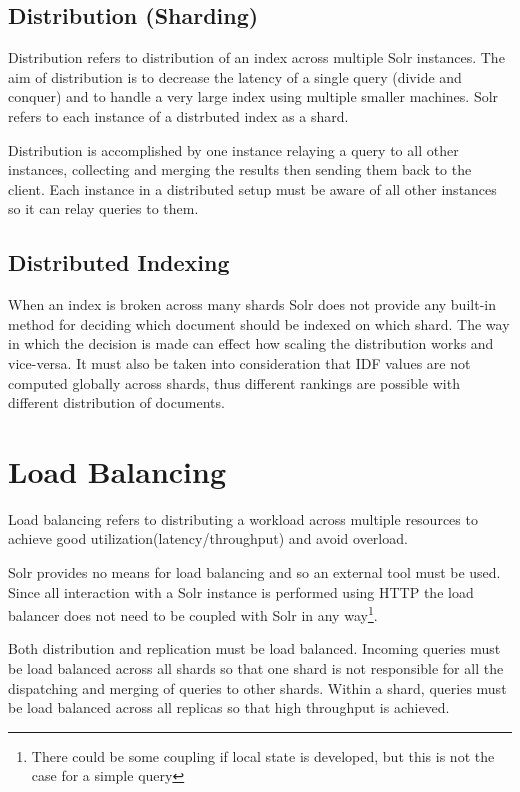 \documentclass{article}
\begin{document}
\subsection{Distribution (Sharding)}
Distribution refers to distribution of an index across multiple Solr
instances. The aim of distribution is to decrease the latency of a
single query (divide and conquer) and to handle a very large index
using multiple smaller machines. Solr refers to each instance of a
distrbuted index as a shard.

Distribution is accomplished by one instance relaying a query to all
other instances, collecting and merging the results then sending them
back to the client. Each instance in a distributed setup must be aware
of all other instances so it can relay queries to them.

\subsection{Distributed Indexing}
When an index is broken across many shards Solr does not provide any
built-in method for deciding which document should be indexed on which
shard. The way in which the decision is made can effect how scaling
the distribution works and vice-versa. It must also be taken into
consideration that IDF values are not computed globally across shards,
thus different rankings are possible with different distribution of
documents.


\section{Load Balancing}

Load balancing refers to distributing a workload across multiple
resources to achieve good utilization(latency/throughput) and avoid
overload.

Solr provides no means for load balancing and so an external tool must
be used. Since all interaction with a Solr instance is performed using
HTTP the load balancer does not need to be coupled with Solr in any
way\footnote{There could be some coupling if local state is developed,
but this is not the case for a simple query}.

Both distribution and replication must be load balanced. Incoming
queries must be load balanced across all shards so that one shard is
not responsible for all the dispatching and merging of queries to
other shards. Within a shard, queries must be load balanced across all
replicas so that high throughput is achieved.
\end{document}
